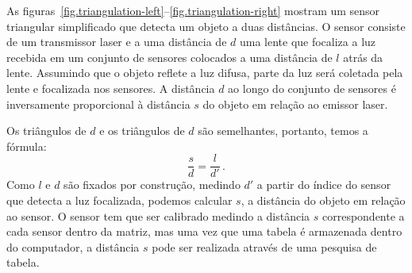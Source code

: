 
As figuras~\ref{fig.triangulation-left}--\ref{fig.triangulation-right} mostram um sensor triangular simplificado que detecta um objeto a duas distâncias. O sensor consiste de um transmissor laser e a uma distância de $d$ uma lente que focaliza a luz recebida em um conjunto de sensores colocados a uma distância de $l$ atrás da lente. Assumindo que o objeto reflete a luz difusa, parte da luz será coletada pela lente e focalizada nos sensores. A distância $d$ ao longo do conjunto de sensores é inversamente proporcional à distância $s$ do objeto em relação ao emissor laser.

Os triângulos de $d$ e os triângulos de $d$ são semelhantes, portanto, temos a fórmula:
\[
\frac{s}{d} = \frac{l}{d'}\,.
\]
Como $l$ e $d$ são fixados por construção, medindo $d'$ a partir do índice do sensor que detecta a luz focalizada, podemos calcular $s$, a distância do objeto em relação ao sensor. O sensor tem que ser calibrado medindo a distância $s$ correspondente a cada sensor dentro da matriz, mas uma vez que uma tabela é armazenada dentro do computador, a distância $s$ pode ser realizada através de uma pesquisa de tabela.

